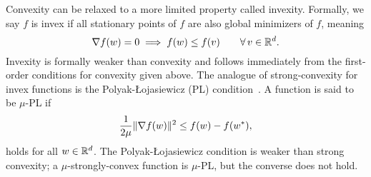Convexity can be relaxed to a more limited property called invexity.
Formally, we say \( f \) is invex if all stationary points of \( f \) are also global minimizers of \( f \), meaning
\[ \nabla f(w) = 0 \implies f(w) \leq f(v) \quad \quad \forall \, v \in \mathbb{R}^d.  \]
Invexity is formally weaker than convexity and follows immediately from the first-order conditions for convexity given above.
The analogue of strong-convexity for invex functions is the Polyak-Łojasiewicz (PL) condition~\citep{karimi2016linear}.
A function is said to be \( \mu \)-PL if
\[ \frac{1}{2 \mu} \|\nabla f(w)\|^2 \leq f(w) - f(w^*), \]
holds for all \( w \in \mathbb{R}^d \).
The Polyak-Łojasiewicz condition is weaker than strong convexity; a \( \mu \)-strongly-convex function is \( \mu \)-PL, but the converse does not hold.


\endinput
